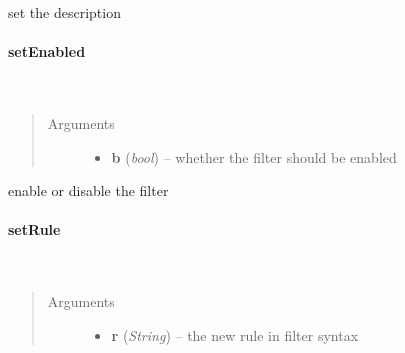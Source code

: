 \documentclass[letterpaper,10pt,english]{sphinxmanual}
\begin{document}
set the description


\paragraph{setEnabled}
\label{ambrosia_web.filter.Filter:setenabled}

\begin{fulllineitems}
\label{ambrosia_web.filter.Filter:ambrosia_web.filter.Filter.setEnabled}~\begin{quote}\begin{description}
\item[{Arguments}] \leavevmode\begin{itemize}
\item {} 
\textbf{b} (\emph{bool}) -- whether the filter should be enabled

\end{itemize}

\end{description}\end{quote}

\end{fulllineitems}


enable or disable the filter


\paragraph{setRule}
\label{ambrosia_web.filter.Filter:setrule}

\begin{fulllineitems}
\label{ambrosia_web.filter.Filter:ambrosia_web.filter.Filter.setRule}~\begin{quote}\begin{description}
\item[{Arguments}] \leavevmode\begin{itemize}
\item {} 
\textbf{r} (\emph{String}) -- the new rule in filter syntax

\end{itemize}

\end{description}\end{quote}

\end{fulllineitems}
\end{document}

